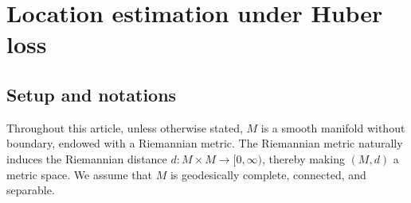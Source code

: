 \documentclass[preprint]{imsart}
\def\Frechet{Fr\'{e}chet}
\theoremstyle{plain}
\theoremstyle{remark}
\begin{document}


\section{Location estimation under Huber loss}\label{sec2}
\subsection{Setup and notations}\label{sec:setup}


Throughout this article, unless otherwise stated, $M$ is a smooth manifold without boundary, endowed with a Riemannian metric. The Riemannian metric naturally induces the Riemannian distance $d: M \times M \rightarrow [0, \infty)$, thereby making $(M, d)$ a metric space. We assume that $M$ is geodesically complete, connected, and separable. %
\end{document}

